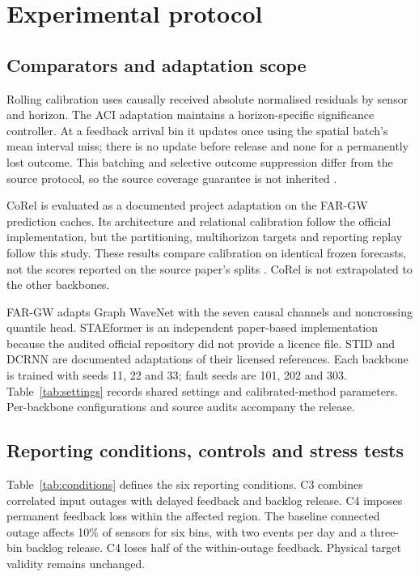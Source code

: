 \section{Experimental protocol}\label{sec:protocol}
\subsection{Comparators and adaptation scope}
Rolling calibration uses causally received absolute normalised residuals by sensor and horizon. The ACI adaptation maintains a horizon-specific significance controller. At a feedback arrival bin it updates once using the spatial batch's mean interval miss; there is no update before release and none for a permanently lost outcome. This batching and selective outcome suppression differ from the source protocol, so the source coverage guarantee is not inherited \citep{hallberg2024}.

CoRel is evaluated as a documented project adaptation on the FAR-GW prediction caches. Its architecture and relational calibration follow the official implementation, but the partitioning, multihorizon targets and reporting replay follow this study. These results compare calibration on identical frozen forecasts, not the scores reported on the source paper's splits \citep{cini2025}. CoRel is not extrapolated to the other backbones.

FAR-GW adapts Graph WaveNet with the seven causal channels and noncrossing quantile head. STAEformer is an independent paper-based implementation because the audited official repository did not provide a licence file. STID and DCRNN are documented adaptations of their licensed references. Each backbone is trained with seeds 11, 22 and 33; fault seeds are 101, 202 and 303. Table~\ref{tab:settings} records shared settings and calibrated-method parameters. Per-backbone configurations and source audits accompany the release.

\subsection{Reporting conditions, controls and stress tests}
Table~\ref{tab:conditions} defines the six reporting conditions. C3 combines correlated input outages with delayed feedback and backlog release. C4 imposes permanent feedback loss within the affected region. The baseline connected outage affects 10\% of sensors for six bins, with two events per day and a three-bin backlog release. C4 loses half of the within-outage feedback. Physical target validity remains unchanged.

